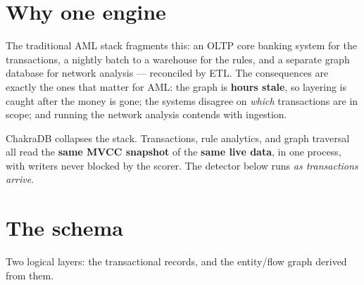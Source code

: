 \documentclass[
  11pt,
  openany]{book}
\begin{document}
\section{Why one engine}\label{why-one-engine}

The traditional AML stack fragments this: an OLTP core banking system
for the transactions, a nightly batch to a warehouse for the rules, and
a separate graph database for network analysis --- reconciled by ETL.
The consequences are exactly the ones that matter for AML: the graph is
\textbf{hours stale}, so layering is caught after the money is gone; the
systems disagree on \emph{which} transactions are in scope; and running
the network analysis contends with ingestion.

ChakraDB collapses the stack. Transactions, rule analytics, and graph
traversal all read the \textbf{same MVCC snapshot} of the \textbf{same
live data}, in one process, with writers never blocked by the scorer.
The detector below runs \emph{as transactions arrive}.

\section{The schema}\label{the-schema}

Two logical layers: the transactional records, and the entity/flow graph
derived from them.
\end{document}
